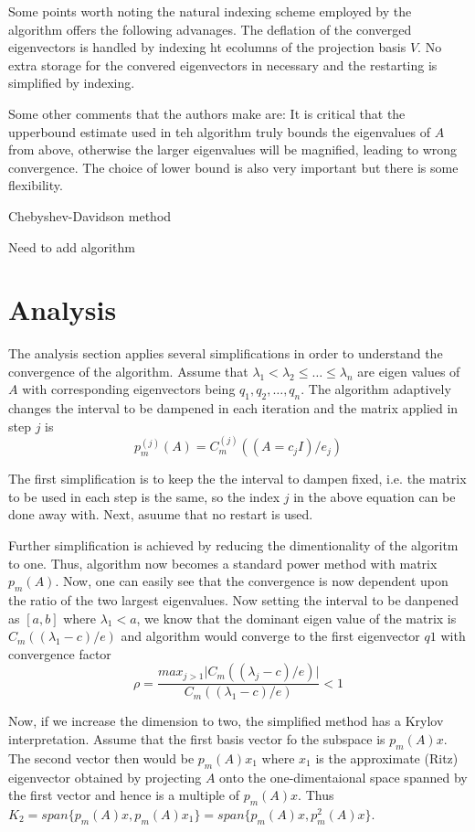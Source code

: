 \documentclass[10pt,a4paper,twoside]{report}
\theoremstyle{definition}
\begin{document}
	Some points worth noting the natural indexing scheme employed by the algorithm offers the following advanages. The deflation of the converged eigenvectors is handled by indexing ht ecolumns of the projection basis $V$. No extra storage for the convered eigenvectors in necessary and the restarting is simplified by indexing. 

	Some other comments that the authors make are: It is critical that the upperbound estimate used in teh algorithm truly bounds the eigenvalues of $A$ from above, otherwise the larger eigenvalues will be magnified, leading to wrong convergence. The choice of lower bound is also very important but there is some flexibility. 

	\IncMargin{2em}
	\begin{algorithm}
		\caption{Chebyshev-Davidson method}
		\label{ChebyshevDavidson}
		Need to add algorithm
	\end{algorithm}

	\section{Analysis}
	The analysis section applies several simplifications in order to understand the convergence of the algorithm. 
	Assume that $\lambda_1 < \lambda_2 \le \dots \le \lambda_n$ are eigen values of $A$ with corresponding eigenvectors being $q_1, q_2,\dots, q_n$. The algorithm adaptively changes the interval to be dampened in each iteration and the matrix applied in step $j$ is $$p_m^{(j)}(A)=C_m^{(j)}((A=c_j I)/e_j)$$ 

	The first simplification is to keep the the interval to dampen fixed, i.e. the matrix to be used in each step is the same, so the index $j$ in the above equation can be done away with. Next, asuume that no restart is used.

	Further simplification is achieved by reducing the dimentionality of the algoritm to one. Thus, algorithm now becomes a standard power method with matrix $p_m(A)$. Now, one can easily see that the convergence is now dependent upon the ratio of the two largest eigenvalues. Now setting the interval to be danpened as $[a,b]$ where $\lambda_1 < a$, we know that the dominant eigen value of the matrix is $C_m((\lambda_1 -c)/e)$ and algorithm would converge to the first eigenvector $q1$ with convergence factor $$ \rho = \frac{max_{j>1}\lvert C_m((\lambda_j - c)/e)\rvert }{C_m((\lambda_1 -c)/e)} < 1$$

	Now, if we increase the dimension to two, the simplified method has a Krylov interpretation. Assume that the first basis vector fo the subspace is $p_m(A)x$. The second vector then would be $p_m(A)x_1$ where $x_1$ is the approximate (Ritz) eigenvector obtained by projecting $A$ onto the one-dimentaional space spanned by the first vector and hence is a multiple of $p_m(A)x$. Thus $K_2 = span\{p_m(A)x, p_m(A)x_1\}=span\{p_m(A)x, p_m^2(A)x\}$.
\end{document}
